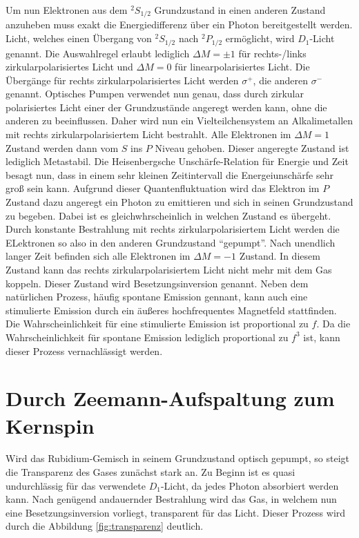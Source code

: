 Um nun Elektronen aus dem $^2S_{1/2}$ Grundzustand in einen anderen Zustand anzuheben muss exakt die Energiedifferenz über ein Photon bereitgestellt werden. Licht, welches 
einen Übergang von $^2S_{1/2}$ nach $^2P_{1/2}$ ermöglicht, wird $D_1$-Licht genannt. Die Auswahlregel erlaubt lediglich $\Delta M = \pm 1$ für rechts-/links zirkularpolarisiertes Licht und 
$\Delta M = 0$ für linearpolarisiertes Licht. Die Übergänge für rechts zirkularpolarisiertes Licht werden $\sigma^+$, die anderen $\sigma^-$ genannt. Optisches Pumpen verwendet nun genau,
dass durch zirkular polarisiertes Licht einer der Grundzustände angeregt werden kann, ohne die anderen zu beeinflussen. Daher wird nun ein Vielteilchensystem an Alkalimetallen mit 
rechts zirkularpolarisiertem Licht bestrahlt. Alle Elektronen im $\Delta M = 1$ Zustand werden dann vom $S$ ins $P$ Niveau gehoben. Dieser angeregte Zustand ist lediglich Metastabil.
Die Heisenbergsche Unschärfe-Relation für Energie und Zeit besagt nun, dass in einem sehr kleinen Zeitintervall die Energeiunschärfe sehr groß sein kann. Aufgrund dieser Quantenfluktuation 
wird das Elektron im $P$ Zustand dazu angeregt ein Photon zu emittieren und sich in seinen Grundzustand zu begeben. Dabei ist es gleichwhrscheinlich in welchen Zustand es übergeht.
Durch konstante Bestrahlung mit rechts zirkularpolarisiertem Licht werden die ELektronen so also in den anderen Grundzustand \enquote{gepumpt}. Nach unendlich langer Zeit befinden sich 
alle Elektronen im $\Delta M = -1$ Zustand. In diesem Zustand kann das rechts zirkularpolarisiertem Licht nicht mehr mit dem Gas koppeln. Dieser Zustand wird Besetzungsinversion genannt.
Neben dem natürlichen Prozess, häufig spontane Emission gennant, kann auch eine stimulierte Emission durch ein äußeres hochfrequentes Magnetfeld stattfinden. Die Wahrscheinlichkeit
für eine stimulierte Emission ist proportional zu $f$. Da die Wahrscheinlichkeit für spontane Emission lediglich proportional zu $f^3$ ist, kann dieser Prozess vernachlässigt werden.

\section{Durch Zeemann-Aufspaltung zum Kernspin}
\label{sec:landee}

Wird das Rubidium-Gemisch in seinem Grundzustand optisch gepumpt, so steigt die Transparenz des Gases zunächst stark an. Zu Beginn ist es quasi undurchlässig für das verwendete 
$D_1$-Licht, da jedes Photon absorbiert werden kann. Nach genügend andauernder Bestrahlung wird das Gas, in welchem nun eine Besetzungsinversion vorliegt, transparent für das Licht. 
Dieser Prozess wird durch die Abbildung \ref{fig:transparenz} deutlich.

